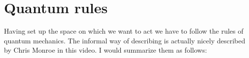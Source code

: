 \section{Quantum rules}
Having set up the space on which we want to act we have to follow the rules of quantum mechanics. The informal way of describing is actually nicely described by Chris Monroe in this video. I would summarize them as follows:
